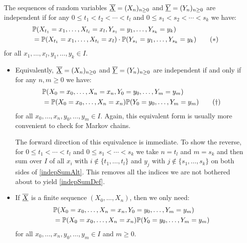 \documentclass[../main.tex]{subfiles}
\begin{document}
\begin{definition}
  The sequences of random variables $\mchain{X} = (X_n)_{n \geq 0}$ and $\mchain{Y} = (Y_n)_{n \geq 0}$ are independent if for any $0 \leq t_1 < t_2 < \cdots < t_l$ and $0 \leq s_1 < s_2 < \cdots <s_k$ we have:
  \begin{align}
    &\P(X_{t_1} = x_1, \ldots, X_{t_l} = x_{l}, Y_{s_1} = y_1, \ldots, Y_{s_k} = y_k) \nonumber \\
    &=\P(X_{t_1} = x_1, \ldots, X_{t_l} = x_l) \cdot \P(Y_{s_1} = y_1, \ldots, Y_{s_k} = y_k) \label{indepSumDef} \tag{$\ast$}
  \end{align}
  for all $x_1, \ldots, x_l, y_1, \ldots, y_k \in I$.
\end{definition}
\begin{remark}[Remarks]
  \begin{itemize}
    \item Equivalently, $\mchain{X} = (X_n)_{n \geq 0}$ and $\mchain{Y} = (Y_n)_{n \geq 0}$ are independent if and only if for any $n , m \geq 0$ we have:
      \begin{align}
        &\P(X_0 = x_0, \ldots, X_n = x_n, Y_0 = y_0, \ldots, Y_m = y_m) \nonumber \\
        &= \P(X_0 = x_0, \ldots, X_n = x_n) \P(Y_0 = y_0, \ldots, Y_m = y_m) \label{indepSumAlt} \tag{\dag}
      \end{align}
      for all $x_0, \ldots, x_n, y_0, \ldots, y_m \in I$.
      Again, this equivalent form is usually more convenient to check for Markov chains.

      The forward direction of this equivalence is immediate.
      To show the reverse, for $0 \leq t_1 < \cdots < t_l$ and $0 \leq s_1 < \cdots < s_k$ we take $n = t_l$ and $m = s_k$ and then sum over $I$ of all $x_i$ with $i \notin \{t_1, \ldots, t_l\}$ and $y_j$ with $j \notin \{s_1, \ldots, s_k\}$ on both sides of \cref{indepSumAlt}.
      This removes all the indices we are not bothered about to yield \cref{indepSumDef}.
    \item If $\mchain{X}$ is a finite sequence $(X_0, \ldots, X_n)$, then we only need:
      \begin{align*}
        &\P(X_0 = x_0, \ldots, X_n = x_n, Y_0 = y_0, \ldots, Y_m = y_m) \\
        &= \P(X_0 = x_0, \ldots, X_n = x_n)\P(Y_0 = y_0, \ldots, Y_m = y_m)
      \end{align*}
      for all $x_0, \ldots, x_n, y_0, \ldots, y_m \in I$ and $m \geq 0$.
  \end{itemize}
\end{remark}
\end{document}
